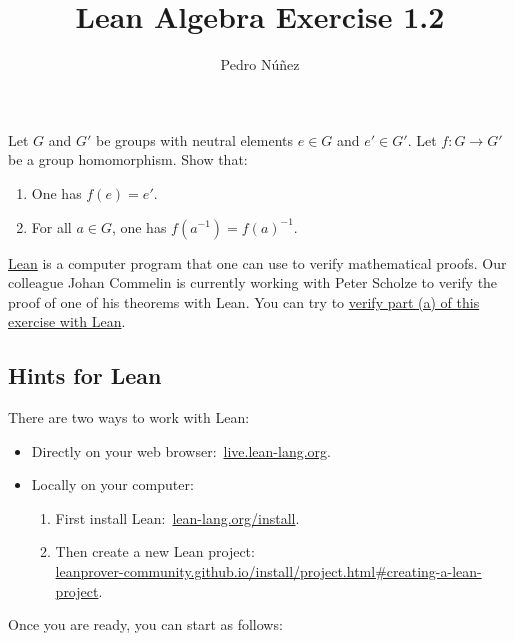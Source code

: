 \documentclass[12pt, a4paper]{article}
\title{Lean Algebra Exercise 1.2}
\author{Pedro N\'{u}\~{n}ez}
\theoremstyle{definition}
\newenvironment{xca}[1] {\renewcommand\theinnercustomthm{#1}\innercustomthm}
  {\endinnercustomthm}
\begin{document}
\begin{xca}{1.2}
  Let $G$ and $G'$ be groups with neutral elements $e \in G$ and $e' \in G'$.
  Let $f \colon G \to G'$ be a group homomorphism.
  Show that:
  \begin{enumerate}[label=(\alph*)]
    \item One has $f(e) = e'$.
    \item For all $a \in G$, one has $f(a^{-1}) = f(a)^{-1}$.
  \end{enumerate}
  \href{https://leanprover-community.github.io/}{Lean} is a computer program that one can use to verify mathematical proofs.
  Our colleague Johan Commelin is currently working with Peter Scholze to verify the proof of one of his theorems with Lean.
  You can try to \href{https://live.lean-lang.org/#codez=JYWwDg9gTgLgBAWQIYwBYBtgCMB0BBdAcwFMsokcBxKCAVzBwBFiAzAZwCgOBabuAMWBQ28ACatgAO2JwkcAMbokbNnGKT5EUVMJw0MwjXpxUEEGehhUwNiFkAPYGZwdFy1dTpgAEmbgBvSjhKAHI4AC44ABUATzBiAF84AG1PY0oAXRS0sGCQrIAKFgjguEAkwjyAShKABRpcgHdUYihiDjgTMwB9EFp0EsAAIlk4LAAaOGKCuQAqEeqAXgnh2eKsLl5o5sk4ERQZJElRODAaADcZfThxNiFiI9a2PpgXfWhiO1AkEi6IFh%2FpAJBUIlWLxJKpIy5TLZSF5DLtOBFEpBCqhaoQry%2BOwsLKRYoARjgi0J4UWWBiCLY0CgMTgGwAouQ2DIqVAabJDnBWmAlPIZMB4A0Bag4DE6FA4BAGtsThBfgBCIA}{verify part (a) of this exercise with Lean}.
\end{xca}

\subsection*{Hints for Lean}

There are two ways to work with Lean:
\begin{itemize}
  \item Directly on your web browser:~\href{https://live.lean-lang.org}{live.lean-lang.org}.
  \item Locally on your computer:
    \begin{enumerate}
      \item First install Lean:~\href{https://lean-lang.org/install}{lean-lang.org/install}.
      \item Then create a new Lean project: \\
        \href{https://leanprover-community.github.io/install/project.html#creating-a-lean-project}{leanprover-community.github.io/install/project.html\#creating-a-lean-project}.
    \end{enumerate}
\end{itemize}
Once you are ready, you can start as follows:
\end{document}
